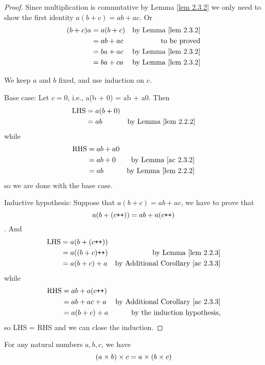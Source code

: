 \begin{proof}
Since multiplication is commutative by Lemma \ref{lem 2.3.2} we only need to show the first identity \(a(b + c)= ab + ac\). Or
\begin{align*}
    (b + c)a & = a(b + c) & \text{by Lemma \ref{lem 2.3.2}} \\
             & = ab + ac  & \text{to be proved} \\
             & = ba + ac  & \text{by Lemma \ref{lem 2.3.2}} \\
             & = ba + ca  & \text{by Lemma \ref{lem 2.3.2}}
\end{align*}

We keep \(a\) and \(b\) fixed, and use induction on \(c\).

Base case: Let \(c = 0\), i.e., a(b + 0) = ab + a0. Then
\begin{align*}
    \text{LHS} & = a(b + 0) \\
        & = ab & \text{by Lemma \ref{lem 2.2.2}}
\end{align*}
while
\begin{align*}
    \text{RHS} & = ab + a0 \\
        & = ab + 0 & \text{by Lemma \ref{ac 2.3.2}} \\
        & = ab & \text{by Lemma \ref{lem 2.2.2}}
\end{align*}
so we are done with the base case.

Inductive hypothesis: Suppose that \(a(b + c) = ab + ac\), we have to prove that
\[a(b + (c\texttt{++})) = ab + a(c\texttt{++})\].
And
\begin{align*}
    \text{LHS} & = a(b + (c\texttt{++})) \\
               & = a((b + c)\texttt{++}) & \text{by Lemma \ref{lem 2.2.3}}\\
               & = a(b + c) + a & \text{by Additional Corollary \ref{ac 2.3.3}} \\
\end{align*}
while
\begin{align*}
    \text{RHS} & = ab + a(c\texttt{++}) \\
               & = ab + ac + a & \text{by Additional Corollary \ref{ac 2.3.3}} \\ 
               & = a(b + c)+ a & \text{by the induction hypothesis,} 
\end{align*}
so LHS = RHS and we can close the induction.
\end{proof}

\begin{proposition} \label{prop 2.3.5}
For any natural numbers \(a, b, c\), we have
\[(a \times b) \times c = a \times (b \times c)\]
\end{proposition}

